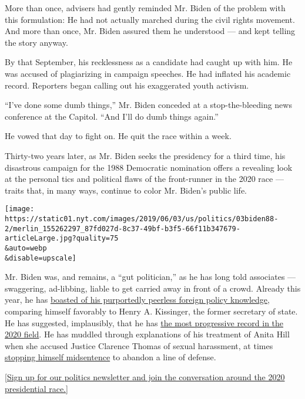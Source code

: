More than once, advisers had gently reminded Mr. Biden of the problem
with this formulation: He had not actually marched during the civil
rights movement. And more than once, Mr. Biden assured them he
understood --- and kept telling the story anyway.

By that September, his recklessness as a candidate had caught up with
him. He was accused of plagiarizing in campaign speeches. He had
inflated his academic record. Reporters began calling out his
exaggerated youth activism.

``I've done some dumb things,'' Mr. Biden conceded at a
stop-the-bleeding news conference at the Capitol. ``And I'll do dumb
things again.''

He vowed that day to fight on. He quit the race within a week.

Thirty-two years later, as Mr. Biden seeks the presidency for a third
time, his disastrous campaign for the 1988 Democratic nomination offers
a revealing look at the personal tics and political flaws of the
front-runner in the 2020 race --- traits that, in many ways, continue to
color Mr. Biden's public life.

\texttt{[image: https://static01.nyt.com/images/2019/06/03/us/politics/03biden88-2/merlin\_155262297\_87fd027d-8c37-49bf-b3f5-66f11b347679-articleLarge.jpg?quality=75\\\&auto=webp\\\&disable=upscale]}

Mr. Biden was, and remains, a ``gut politician,'' as he has long told
associates --- swaggering, ad-libbing, liable to get carried away in
front of a crowd. Already this year, he has
\href{https://www.cbsnews.com/news/biden-raises-more-than-100000-at-south-carolina-fundraiser/}{boasted
of his purportedly peerless foreign policy knowledge}, comparing himself
favorably to Henry A. Kissinger, the former secretary of state. He has
suggested, implausibly, that he has
\href{https://abcnews.go.com/Politics/video/biden-progressive-records-running-62735484}{the
most progressive record in the 2020 field}. He has muddled through
explanations of his treatment of Anita Hill when she accused Justice
Clarence Thomas of sexual harassment, at times
\href{https://www.nytimes.com/2019/04/26/us/politics/biden-the-view.html}{stopping
himself midsentence} to abandon a line of defense.

{[}\href{https://www.nytimes.com/newsletters/politics?smid=rd?action=click\&module=Intentional\&pgtype=Article}{Sign
up for our politics newsletter and join the conversation around the 2020
presidential race.}{]}

